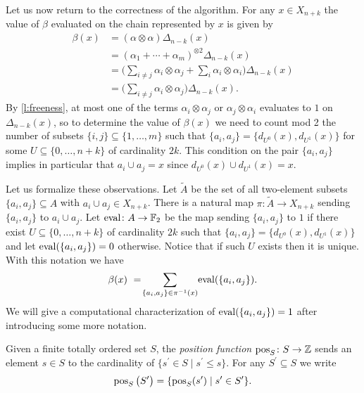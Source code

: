 Let us now return to the correctness of the algorithm.
For any $x \in X_{n+k}$ the value of $\beta$ evaluated on the chain represented by $x$ is given by
\begin{align*}
\beta(x) & =
(\alpha \otimes \alpha) \Delta_{n-k}(x) \\ & =
(\alpha_1 + \cdots + \alpha_m)^{\otimes 2} \Delta_{n-k}(x) \\ & =
\Big(\sum_{i \neq j} \alpha_i \otimes \alpha_j + \sum_{i} \alpha_i \otimes \alpha_i \Big)
\Delta_{n-k}(x) \\ & =
\Big(\sum_{i \neq j} \alpha_i \otimes \alpha_j\Big)
\Delta_{n-k}(x).
\end{align*}
By \cref{l:freeness}, at most one of the terms $\alpha_i \otimes \alpha_j$ or $\alpha_j \otimes \alpha_i$ evaluates to $1$ on $\Delta_{n-k}(x)$, so to determine the value of $\beta(x)$ we need to count mod 2 the number of subsets $\{i,j\} \subseteq \{1,\dots, m\}$ such that $\{a_i, a_j\} = \{d_{U^0}(x), d_{U^1}(x)\}$ for some $U \subseteq \{0, \dots, n+k\}$ of cardinality $2k$.
This condition on the pair $\{a_i, a_j\}$ implies in particular that $a_i \cup a_j = x$ since $d_{U^0}(x) \cup d_{U^1}(x) = x$.

Let us formalize these observations.
Let $\widetilde{A}$ be the set of all two-element subsets $\{a_i, a_j\} \subseteq A$ with $a_i \cup a_j \in X_{n+k}$.
There is a natural map $\pi \colon \widetilde{A} \to X_{n+k}$ sending $\{a_i, a_j\}$ to $a_i \cup a_j$.
Let $\operatorname{eval} \colon A \to {\mathbb{F}_2}$ be the map sending $\{a_i, a_j\}$ to $1$ if there exist $U \subseteq \{0, \dots, n+k\}$ of cardinality $2k$ such that $\{a_i, a_j\} = \{d_{U^0}(x), d_{U^1}(x)\}$ and let $\operatorname{eval}(\{a_i, a_j\}) = 0$ otherwise.
Notice that if such $U$ exists then it is unique.
With this notation we have
\begin{equation*}
\beta(x) \ = \! \sum_{\{a_i, a_j\} \in \pi^{-1}(x)} \! \operatorname{eval}(\{a_i, a_j\}).
\end{equation*}
We will give a computational characterization of $\operatorname{eval}(\{a_i, a_j\}) = 1$ after introducing some more notation.

Given a finite totally ordered set $S$, the \textit{position function} $\operatorname{pos}_S \colon S \to \mathbb{Z}$ sends an element $s \in S$ to the cardinality of $\{s^\prime \in S \mid s^\prime \leq s\}$.
For any $S^\prime \subseteq S$ we write
\[
\operatorname{pos}_{S} \big( S^\prime \big) =
\{\operatorname{pos}_{S} (s^\prime) \mid s^\prime \in S^\prime\}.
\]

